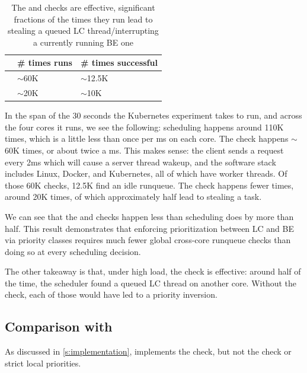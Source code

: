 \begin{table}[t]
    \centering
    \begin{tabular}{|l|l|l|}
        \hline
                & \# times runs & \# times successful \\ \hline
        \entry{} & $\sim$60K    & $\sim$12.5K         \\ \hline
        \exit{}  & $\sim$20K    & $\sim$10K          \\ \hline
    \end{tabular}
    \vspace{10pt}
    \caption{The \exit{} and \entry{} checks are effective, significant
    fractions of the times they run lead to stealing a queued LC
    thread/interrupting a currently running BE one}\label{tab:check-counts}
\end{table}

In the span of the 30 seconds the Kubernetes experiment takes to run, and across
the four cores it runs, we see the following: scheduling happens around 110K
times, which is a little less than once per ms on each core. The \entry{} check
happens $\sim$60K times, or about twice a ms. This makes sense: the client sends
a request every 2ms which will cause a server thread wakeup, and the software
stack includes Linux, Docker, and Kubernetes, all of which have worker threads.
Of those 60K \entry{} checks, 12.5K find an idle runqueue. The \exit{} check
happens fewer times, around 20K times, of which approximately half lead to
stealing a \schednormal{} task.

We can see that the \entry{} and \exit{} checks happen less than scheduling does
by more than half. This result demonstrates that enforcing prioritization
between LC and BE via priority classes requires much fewer global cross-core
runqueue checks than doing so at every scheduling decision.

The other takeaway is that, under high load, the \exit{} check is effective:
around half of the time, the scheduler found a queued LC thread on another core.
Without the check, each of those would have led to a priority inversion.


\subsection{Comparison with \schedidle}\label{ss:eval:schedidle}

As discussed in \autoref{s:implementation}, \schedidle{} implements the \entry{}
check, but not the \exit{} check or strict local priorities.

